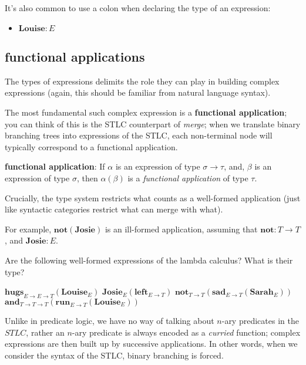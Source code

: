 \documentclass[letterpaper,parskip=half]{scrartcl}
\begin{document}
It's also common to use a colon when declaring the type of an expression:

\begin{itemize}
\item \(\mathbf{Louise} : E\)
\end{itemize}

\subsection{functional applications}
\label{sec:orgc4f0021}

The types of expressions delimits the role they can play in building complex expressions (again, this should be familiar from natural language syntax).

The most fundamental such complex expression is a \textbf{functional application}; you can think of this is the STLC counterpart of \emph{merge}; when we translate binary branching trees into expressions of the STLC, each non-terminal node will typically correspond to a functional application.

\begin{definition}
\textbf{functional application}: If \(\alpha\) is an expression of type \(\sigma \to  \tau\), and, \(\beta\) is an expression of type \(\sigma\), then \(\alpha (\beta)\) is a \emph{functional application} of type \(\tau\).
\end{definition}

Crucially, the type system restricts what counts as a well-formed application (just like syntactic categories restrict what can merge with what).

For example, \(\mathbf{not}(\mathbf{Josie})\) is an ill-formed application, assuming that \(\mathbf{not}: T \to T\), and \(\mathbf{Josie}: E\).

Are the following well-formed expressions of the lambda calculus? What is their type?

\begin{exe}
\ex \(\mathbf{hugs}_{E \to E \to T}(\mathbf{Louise}_{E})\)
\ex \(\mathbf{Josie}_E(\mathbf{left}_{E \to T})\)
\ex \(\mathbf{not}_{T \to T}(\mathbf{sad}_{E \to T}(\mathbf{Sarah}_E))\)
\ex \(\mathbf{and}_{T \to T \to T}(\mathbf{run}_{E \to T}(\mathbf{Louise}_E))\)
\label{orgb078144}
\end{exe}

Unlike in predicate logic, we have no way of talking about \(n\)-ary predicates in the \(STLC\), rather an \(n\)-ary predicate is always encoded as a \emph{curried} function; complex expressions are then built up by successive applications. In other words, when we consider the syntax of the STLC, binary branching is forced.
\end{document}
